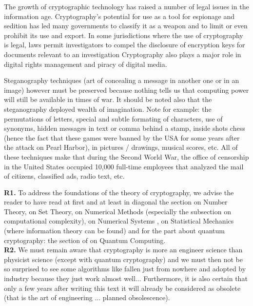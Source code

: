 	The growth of cryptographic technology has raised a number of legal issues in the information age. Cryptography's potential for use as a tool for espionage and sedition has led many governments to classify it as a weapon and to limit or even prohibit its use and export. In some jurisdictions where the use of cryptography is legal, laws permit investigators to compel the disclosure of encryption keys for documents relevant to an investigation Cryptography also plays a major role in digital rights management and piracy of digital media.
	
	Steganography techniques (art of concealing a message in another one or in an image) however must be preserved because nothing tells us that computing power will still be available in times of war. It should be noted also that the steganography deployed wealth of imagination. Note for example: the permutations of letters, special and subtle formating of characters, use of synonyms, hidden messages in text or comma behind a stamp, inside shots chess (hence the fact that these games were banned by the USA for some years after the attack on Pearl Harbor), in pictures / drawings, musical scores, etc. All of these techniques make that during the Second World War, the office of censorship in the United States occupied 10,000 full-time employees that analyzed the mail of citizens, classified ads, radio text, etc.
	
	\begin{tcolorbox}[title=Remarks,colframe=black,arc=10pt]
	\textbf{R1.} To address the foundations of the theory of cryptography, we advise the reader to have read at first and at least in diagonal the section on Number Theory, on Set Theory, on Numerical Methods (especially the subsection on computational complexity), on Numerical Systems , on Statistical Mechanics (where information theory can be found) and for the part about quantum cryptography: the section of on Quantum Computing.\\
	
	\textbf{R2.} We must remain aware that cryptography is more an engineer science than physicist science (except with quantum cryptography) and we must then not be so surprised to see some algorithms like fallen just from nowhere and adopted by industry because they just work almost well... Furthermore, it is also certain that only a few years after writing this text it will already be considered as obsolete (that is the art of engineering ... planned obsolescence).
	\end{tcolorbox}
	
